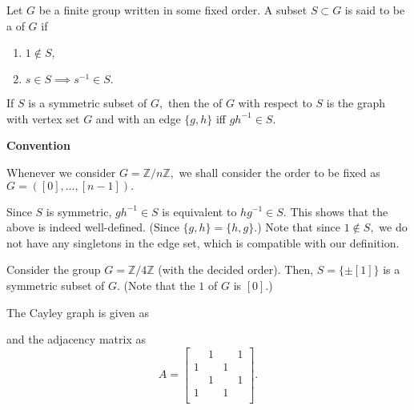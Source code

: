 \documentclass[12pt]{article}	%
\begin{document}
\begin{defn}%
    Let $G$ be a finite group written in some fixed order. A subset $S \subset G$ is said to be a  of $G$ if
    \begin{enumerate}
        \item $1 \notin S,$
        \item $s \in S \implies s^{-1} \in S.$
    \end{enumerate}
    If $S$ is a symmetric subset of $G,$ then the  of $G$ with respect to $S$ is the graph with vertex set $G$ and with an edge $\{g, h\}$ iff $gh^{-1} \in S.$
\end{defn}

\begin{aside}
    \textbf{Convention}

    Whenever we consider $G = \mathbb{Z}/n\mathbb{Z},$ we shall consider the order to be fixed as $G = ([0], \ldots, [n - 1]).$
\end{aside}

\begin{rem}
    Since $S$ is symmetric, $gh^{-1} \in S$ is equivalent to $hg^{-1} \in S.$ This shows that the above is indeed well-defined. (Since $\{g, h\} = \{h, g\}.$) Note that since $1 \notin S,$ we do not have any singletons in the edge set, which is compatible with our definition.
\end{rem}

\begin{ex}
    Consider the group $G = \mathbb{Z}/4\mathbb{Z}$ (with the decided order). Then, $S = \{\pm [1]\}$ is a symmetric subset of $G.$ (Note that the $1$ of $G$ is $[0].$)

    The Cayley graph is given as

    \begin{center}
        \captionsetup{type=figure}
         \label{fig:cayleyz4z}
    \end{center}
    and the adjacency matrix as
    \begin{equation*} 
        A = \begin{bmatrix}
            & 1 & & 1\\
             1 &&  1&\\
            & 1 & & 1\\
             1 &&  1&\\
        \end{bmatrix}.
    \end{equation*}
\end{ex}  
\end{document}
